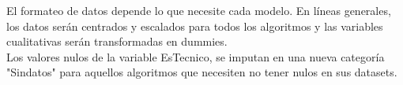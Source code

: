 
El formateo de datos depende lo que necesite cada modelo. En líneas generales, los datos serán centrados y escalados para todos los algoritmos y las variables cualitativas serán transformadas en dummies. \\

Los valores nulos de la variable EsTecnico, se imputan en una nueva categoría "Sindatos" para aquellos algoritmos que necesiten no tener nulos en sus datasets. 

